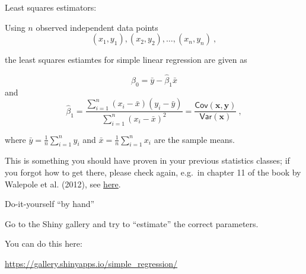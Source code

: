 \documentclass[10pt,ignorenonframetext,]{beamer}
\begin{document}
\begin{frame}

\begin{block}{Least squares estimators:}

\vspace{2mm}

Using \(n\) observed independent data points
\[(x_1,y_1), (x_2,y_2), \ldots, (x_n,y_n)\ ,\]

the least squares estiamtes for simple linear regression are given as

\begin{equation} 
\hat{\beta}_0 = \bar{y}-\hat{\beta}_1 \bar{x}
\end{equation} and \begin{equation} 
\hat{\beta}_1 = \frac{\sum_{i=1}^n(x_i-\bar{x})(y_i-\bar{y})}{\sum_{i=1}^n(x_i-\bar{x})^2} = \frac{\mathsf{Cov}(\boldsymbol{x},\boldsymbol{y})}{\mathsf{Var}(\boldsymbol{x})}\ ,
\end{equation}

\vspace{2mm}

where \(\bar{y} = \frac{1}{n} \sum_{i=1}^n y_i\) and
\(\bar{x} = \frac{1}{n}\sum_{i=1}^n x_i\) are the sample means.

\vspace{6mm}
\scriptsize

This is something you should have proven in your previous statistics
classes; if you forgot how to get there, please check again, e.g.~in
chapter 11 of the book by Walepole et al. (2012), see
\href{https://github.com/stefaniemuff/statlearning/blob/master/literature/Walepole_book.pdf}{here}.

\end{block}

\end{frame}

\begin{frame}

\begin{block}{Do-it-yourself ``by hand''}

\vspace{6mm}

Go to the Shiny gallery and try to ``estimate'' the correct parameters.
\vspace{2mm}

You can do this here: \vspace{2mm}

\url{https://gallery.shinyapps.io/simple_regression/}

\end{block}

\end{frame}
\end{document}
